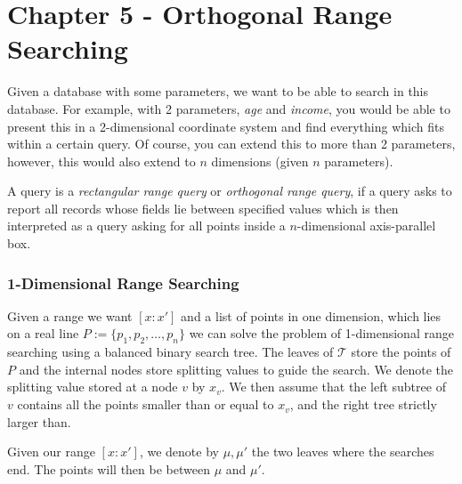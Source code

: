 \chapter{Chapter 5 - Orthogonal Range Searching}

Given a database with some parameters, we want to be able to search in this database. For example, with 2 parameters, \textit{age} and \textit{income}, you would be able to present this in a 2-dimensional coordinate system and find everything which fits within a certain query. Of course, you can extend this to more than 2 parameters, however, this would also extend to $n$ dimensions (given $n$ parameters).

A query is a \textit{rectangular range query} or \textit{orthogonal range query}, if a query asks to report all records whose fields lie between specified values which is then interpreted as a query asking for all points inside a $n$-dimensional axis-parallel box.

\subsection{1-Dimensional Range Searching}%
\label{subsec:5.1}

Given a range we want $[x : x']$ and a list of points in one dimension, which lies on a real line $P := \{p_{1}, p_{2}, \ldots, p_{n}\}$ we can solve the problem of 1-dimensional range searching using a balanced binary search tree. The leaves of $\mathcal{T}$ store the points of $P$ and the internal nodes store splitting values to guide the search. We denote the splitting value stored at a node $v$ by $x_{v}$. We then assume that the left subtree of $v$ contains all the points smaller than or equal to $x_{v}$, and the right tree strictly larger than.

Given our range $[x : x']$, we denote by $\mu, \mu'$ the two leaves where the searches end. The points will then be between \(\mu\) and \(\mu'\).


